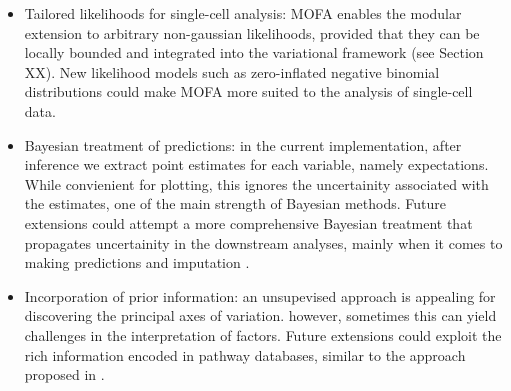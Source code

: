 \begin{itemize}
	\item Tailored likelihoods for single-cell analysis: MOFA enables the modular extension to arbitrary non-gaussian likelihoods, provided that they can be locally bounded and integrated into the variational framework (see Section XX). New likelihood models such as zero-inflated negative binomial distributions \cite{Risso2018} could make MOFA more suited to the analysis of single-cell data.

	\item Bayesian treatment of predictions: in the current implementation, after inference we extract point estimates for each variable, namely expectations. While convienient for plotting, this ignores the uncertainity associated with the estimates, one of the main strength of Bayesian methods. Future extensions could attempt a more comprehensive Bayesian treatment that propagates uncertainity in the downstream analyses, mainly when it comes to making predictions and imputation \cite{XX}.

	\item Incorporation of prior information: an unsupevised approach is appealing for discovering the principal axes of variation. however, sometimes this can yield challenges in the interpretation of factors. Future extensions could exploit the rich information encoded in pathway databases, similar to the approach proposed in \cite{Buettner2017}.

\end{itemize}


